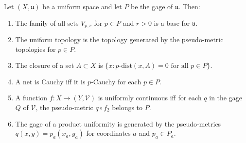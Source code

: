 Let $(X, \mathfrak{u})$ be a uniform space and let $P$ be the gage of $\mathfrak{u}$. Then:
\begin{enumerate}
\item[(a)] The family of all sets $V_{p,r}$ for $p \in P$ and $r > 0$ is a base for $\mathfrak{u}$.
\item[(b)] The uniform topology is the topology generated by the pseudo-metric topologies for $p \in P$.
\item[(c)] The closure of a set $A \subset X$ is $\{x : p\text{-dist}(x,A) = 0 \text{ for all } p \in P\}$.
\item[(d)] A net is Cauchy iff it is $p$-Cauchy for each $p \in P$.
\item[(e)] A function $f : X \to (Y, \mathcal{V})$ is uniformly continuous iff for each $q$ in the gage $Q$ of $\mathcal{V}$, the pseudo-metric $q \circ f_2$ belongs to $P$.
\item[(f)] The gage of a product uniformity is generated by the pseudo-metrics $q(x,y) = p_a(x_a, y_a)$ for coordinates $a$ and $p_a \in P_a$.
\end{enumerate}
